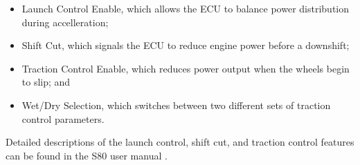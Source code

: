 \begin{itemize}
	\item Launch Control Enable, which allows the ECU to balance power distribution during accelleration;
    \item Shift Cut, which signals the ECU to reduce engine power before a downshift;
    \item Traction Control Enable, which reduces power output when the wheels begin to slip; and
    \item Wet/Dry Selection, which switches between two different sets of traction control parameters.
\end{itemize}

Detailed descriptions of the launch control, shift cut, and traction control features can be found in the S80 user manual \cite{s80pro}.


